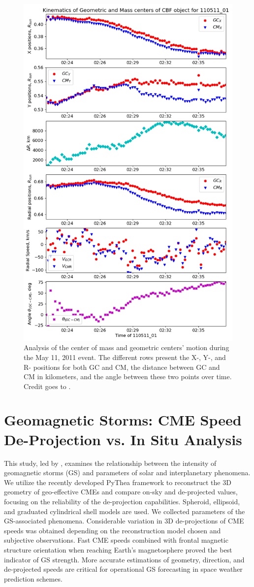 \begin{figure}[!htp]
	\centering
	\includegraphics[width=0.7\hsize]{chapter2/figs/event_110511_01_centers_of_mass.png}
	\caption{Analysis of the center of mass and geometric centers' motion during the May 11, 2011 event. The different rows present the X-, Y-, and R- positions for both GC and CM, the distance between GC and CM in kilometers, and the angle between these two points over time. Credit goes to \citet{stepanyuk_2022}.}
	\label{fig_wavetrack_center_of_mass}
\end{figure}


\section{Geomagnetic Storms: CME Speed De-Projection vs. In Situ Analysis}
This study, led by \citet{miteva_2023}, examines the relationship between the intensity of geomagnetic storms (GS) and parameters of solar and interplanetary phenomena. We utilize the recently developed PyThea framework to reconstruct the 3D geometry of geo-effective CMEs and compare on-sky and de-projected values, focusing on the reliability of the de-projection capabilities. Spheroid, ellipsoid, and graduated cylindrical shell models are used. We collected parameters of the GS-associated phenomena. Considerable variation in 3D de-projections of CME speeds was obtained depending on the reconstruction model chosen and subjective observations. Fast CME speeds combined with frontal magnetic structure orientation when reaching Earth's magnetosphere proved the best indicator of GS strength. More accurate estimations of geometry, direction, and de-projected speeds are critical for operational GS forecasting in space weather prediction schemes.

